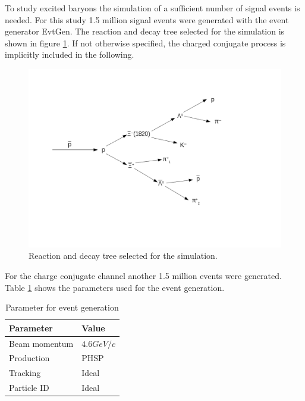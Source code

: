 To study excited \cascade baryons the simulation of a sufficient number of signal events is needed.
For this study 1.5 million signal events were generated with the event generator EvtGen.
The reaction and decay tree selected for the simulation is shown in figure \ref{fig:eventgeneration_decaychannel}.
If not otherwise specified, the charged conjugate process is implicitly included in the following. 

\begin{figure}[htbp]
	\centering
			\includegraphics[width=1.00\textwidth]{./plots/DecayChannelXi1820.png}
	\caption{Reaction and decay tree selected for the simulation.}
	\label{fig:eventgeneration_decaychannel}
\end{figure}

For the charge conjugate channel another 1.5 million events were generated.
Table \ref{tab:eventgeneration_parameter} shows the parameters used for the event generation.

\begin{table}[tbp]
	\caption{Parameter for event generation}
	\label{tab:eventgeneration_parameter}
	\centering
	\begin{tabular}{ll}
		\hline
		Parameter & Value \\
		\hline
		\hline
		Beam momentum & $4.6\unit{GeV/c}$  \\
		Production & PHSP \\
		Tracking & Ideal \\
		Particle ID & Ideal \\\hline
		 
	\end{tabular}
\end{table}

